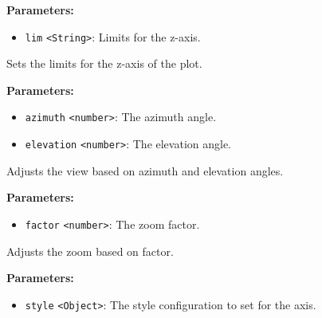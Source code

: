 \documentclass[12pt,a4paper]{article}
\begin{document}
\vspace{5mm}
\noindent {}


\noindent \textbf{Parameters:}
\begin{itemize}
  \item \texttt{lim} \texttt{<String>}: Limits for the z-axis.
\end{itemize}

\noindent Sets the limits for the z-axis of the plot.

\vspace{5mm}
\noindent {}


\noindent \textbf{Parameters:}
\begin{itemize}
  \item \texttt{azimuth} \texttt{<number>}: The azimuth angle.
  \item \texttt{elevation} \texttt{<number>}: The elevation angle.
\end{itemize}

\noindent Adjusts the view based on azimuth and elevation angles.

\vspace{5mm}
\noindent {}


\noindent \textbf{Parameters:}
\begin{itemize}
  \item \texttt{factor} \texttt{<number>}: The zoom factor.
\end{itemize}

\noindent Adjusts the zoom based on factor.

\vspace{5mm}
\noindent {}


\noindent \textbf{Parameters:}
\begin{itemize}
  \item \texttt{style} \texttt{<Object>}: The style configuration to set for the axis.
\end{itemize}
\end{document}
